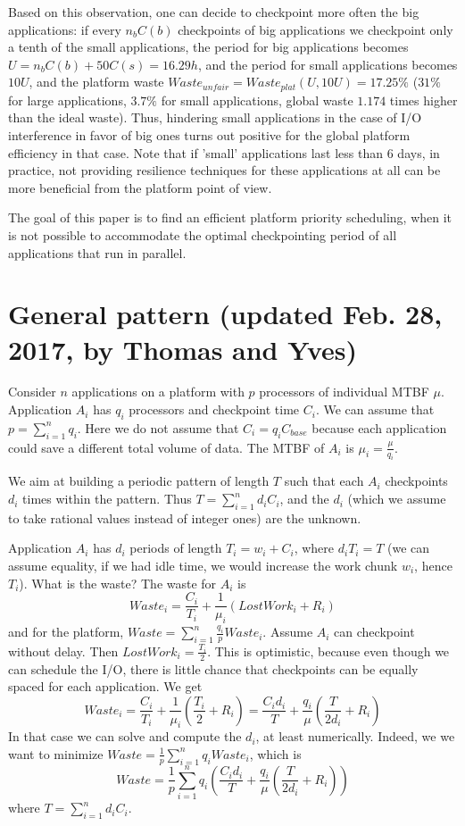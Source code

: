 \documentclass{article}
\begin{document}
Based on this observation, one can decide to checkpoint more often the big applications: if every $n_bC(b)$ checkpoints of big applications we checkpoint only a tenth of the small applications, the period for big applications becomes $U = n_bC(b)+50C(s) = 16.29h$, and the period for small applications becomes $10U$, and the platform waste $Waste_{unfair} = Waste_{plat}(U, 10U) = 17.25\%$ ($31\%$ for large applications, $3.7\%$ for small applications, global waste $1.174$ times higher than the ideal waste). Thus, hindering small applications in the case of I/O interference in favor of big ones turns out positive for the global platform efficiency in that case. Note that if 'small' applications last less than 6 days, in practice, not providing resilience techniques for these applications at all can be more beneficial from the platform point of view.

The goal of this paper is to find an efficient platform priority scheduling, when it is not possible to accommodate the optimal checkpointing period of all applications that run in parallel.


\section{General pattern (updated Feb. 28, 2017, by Thomas and Yves)}

Consider $n$ applications on a platform with $p$ processors of individual MTBF $\mu$.
 Application $A_{i}$ has $q_{i}$ processors and checkpoint time $C_{i}$. We can
 assume that $p = \sum_{i=1}^{n} q_{i}$.
Here we do not assume that $C_{i} = q_{i} C_{\textit{base}}$ because each application could save a different total volume of data. The MTBF of $A_{i}$ is $\mu_{i} = \frac{\mu}{q_{i}}$.

We aim at building a periodic pattern of length $T$ such that each $A_{i}$ checkpoints $d_{i}$ times
within the pattern. Thus $T  = \sum_{i=1}^{n} d_{i} C_{i}$, and the $d_{i}$ (which we assume
to take rational values instead of integer ones) are the unknown. 

Application $A_{i}$ has $d_{i}$ periods of length $T_{i } = w_{i}+C_{i}$, where 
$d_{i} T_{i} =T$
(we can assume equality, if we had idle time, we would increase the work chunk $w_{i}$, hence $T_{i}$).
What is the waste? The waste for $A_{i}$ is 
$$Waste_{i} = \frac{C_{i}}{T_{i}} + \frac{1}{\mu_{i}} (LostWork_{i} + R_{i})$$
and for the platform, $Waste = \sum_{i=1}^{n} \frac{q_{i}}{p} Waste_{i}$.
Assume $A_{i}$ can checkpoint without delay. Then $LostWork_{i} = \frac{T_{i}}{2}$.
This is  optimistic, because even though we can schedule the I/O, there is little chance that checkpoints can be equally spaced for each application.
We get
$$Waste_{i} = \frac{C_{i}}{T_{i}} + \frac{1}{\mu_{i}} (\frac{T_{i}}{2} + R_{i})
= \frac{C_{i} d_{i}}{T}+ \frac{q_{i}}{\mu} (\frac{T}{2d_{i}} + R_{i})$$
In that case we can solve and compute the $d_{i}$, at least numerically. 
Indeed, we we want to minimize 
$Waste = \frac{1}{p} \sum_{i=1}^{n} q_{i} Waste_{i}$, 
which is 
$$Waste = \frac{1}{p} \sum_{i=1}^{n} q_{i} (\frac{C_{i} d_{i}}{T}+ \frac{q_{i}}{\mu} (\frac{T}{2d_{i}} + R_{i}))$$
where $T  = \sum_{i=1}^{n} d_{i} C_{i}$.
\end{document}
